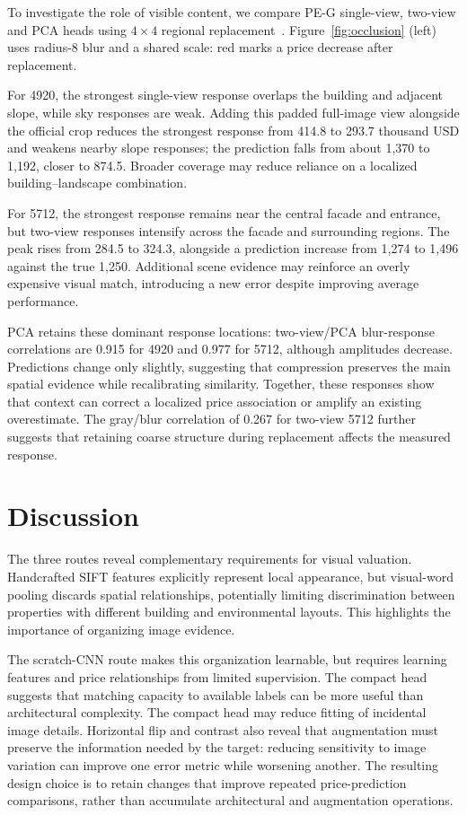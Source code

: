 \documentclass[conference,a4paper]{IEEEtran}
\begin{document}
\begin{samepage}
To investigate the role of visible content, we compare PE-G single-view, two-view and PCA heads using $4\times4$ regional replacement~\cite{occlusion}. Figure~\ref{fig:occlusion} (left) uses radius-8 blur and a shared scale: red marks a price decrease after replacement.

For 4920, the strongest single-view response overlaps the building and adjacent slope, while sky responses are weak. Adding this padded full-image view alongside the official crop reduces the strongest response from 414.8 to 293.7 thousand USD and weakens nearby slope responses; the prediction falls from about 1,370 to 1,192, closer to 874.5. Broader coverage may reduce reliance on a localized building--landscape combination.\par
\end{samepage}

For 5712, the strongest response remains near the central facade and entrance, but two-view responses intensify across the facade and surrounding regions. The peak rises from 284.5 to 324.3, alongside a prediction increase from 1,274 to 1,496 against the true 1,250. Additional scene evidence may reinforce an overly expensive visual match, introducing a new error despite improving average performance.

PCA retains these dominant response locations: two-view/PCA blur-response correlations are 0.915 for 4920 and 0.977 for 5712, although amplitudes decrease. Predictions change only slightly, suggesting that compression preserves the main spatial evidence while recalibrating similarity. Together, these responses show that context can correct a localized price association or amplify an existing overestimate. The gray/blur correlation of 0.267 for two-view 5712 further suggests that retaining coarse structure during replacement affects the measured response.

\section{Discussion}
The three routes reveal complementary requirements for visual valuation. Handcrafted SIFT features explicitly represent local appearance, but visual-word pooling discards spatial relationships, potentially limiting discrimination between properties with different building and environmental layouts. This highlights the importance of organizing image evidence.

The scratch-CNN route makes this organization learnable, but requires learning features and price relationships from limited supervision. The compact head suggests that matching capacity to available labels can be more useful than architectural complexity. The compact head may reduce fitting of incidental image details. Horizontal flip and contrast also reveal that augmentation must preserve the information needed by the target: reducing sensitivity to image variation can improve one error metric while worsening another. The resulting design choice is to retain changes that improve repeated price-prediction comparisons, rather than accumulate architectural and augmentation operations.
\end{document}
